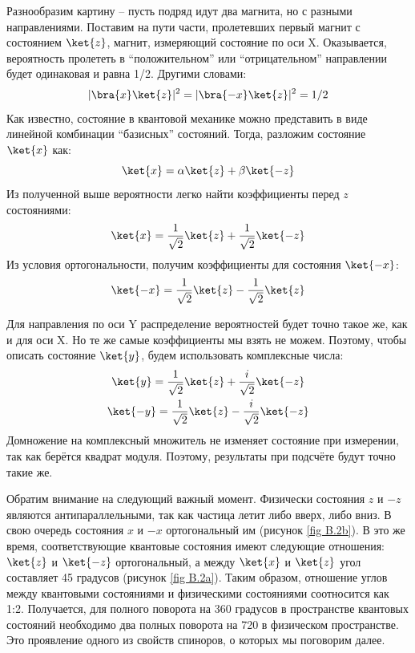 Разнообразим картину -- пусть подряд идут два магнита, но с разными направлениями. Поставим на пути части, пролетевших первый магнит с состоянием $\ket{z}$, магнит, измеряющий состояние по оси X. Оказывается, вероятность пролететь в ``положительном'' или ``отрицательном'' направлении будет одинаковая и равна 1/2. Другими словами:
\[
|\bra{x}\ket{z}|^2 = |\bra{-x}\ket{z}|^2 = 1/2
\]
Как известно, состояние в квантовой механике можно представить в виде линейной комбинации ``базисных'' состояний. Тогда, разложим состояние $\ket{x}$ как:
\[
\ket{x} = \alpha\ket{z} + \beta\ket{-z}
\]
Из полученной выше вероятности легко найти коэффициенты перед $z$ состояниями:
\[
\ket{x} = \frac{1}{\sqrt{2}}\ket{z} + \frac{1}{\sqrt{2}}\ket{-z}
\]
Из условия ортогональности, получим коэффициенты для состояния $\ket{-x}$:
\[
\ket{-x} = \frac{1}{\sqrt{2}}\ket{z} - \frac{1}{\sqrt{2}}\ket{z}
\]

Для направления по оси Y распределение вероятностей будет точно такое же, как и для оси X. Но те же самые коэффициенты мы взять не можем. Поэтому, чтобы описать состояние $\ket{y}$, будем использовать комплексные числа:
\begin{gather*}
\ket{y} = \frac{1}{\sqrt{2}}\ket{z} + \frac{i}{\sqrt{2}}\ket{-z}\\
\ket{-y} = \frac{1}{\sqrt{2}}\ket{z} - \frac{i}{\sqrt{2}}\ket{-z}
\end{gather*}
Домножение на комплексный множитель не изменяет состояние при измерении, так как берётся квадрат модуля. Поэтому, результаты при подсчёте будут точно такие же.

Обратим внимание на следующий важный момент. Физически состояния $z$ и $-z$ являются антипараллельными, так как частица летит либо вверх, либо вниз. В свою очередь состояния $x$ и $-x$ ортогональный им (рисунок \ref{fig B.2b}). В это же время, соответствующие квантовые состояния имеют следующие отношения: $\ket{z}$ и $\ket{-z}$ ортогональный, а между $\ket{x}$ и $\ket{z}$ угол составляет 45 градусов (рисунок \ref{fig B.2a}). Таким образом, отношение углов между квантовыми состояниями и физическими состояниями соотносится как 1:2. Получается, для полного поворота на 360 градусов в пространстве квантовых состояний необходимо два полных поворота на 720 в физическом пространстве. Это проявление одного из свойств спиноров, о которых мы поговорим далее.

